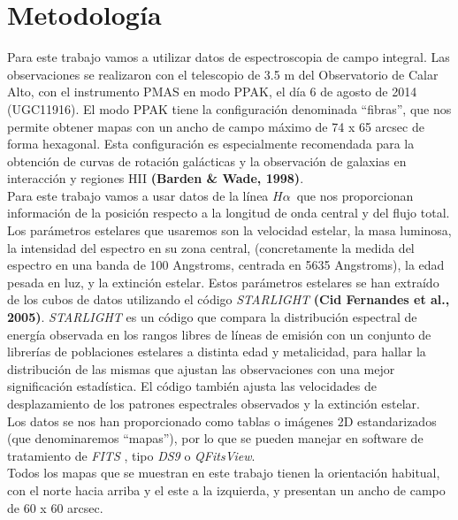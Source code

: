 \documentclass{article}
\newcommand{\hal}{$H\alpha$}
\begin{document}
\section{Metodología}
Para este trabajo vamos a utilizar datos de espectroscopia de campo integral. Las observaciones se realizaron con el telescopio de 3.5 m del Observatorio de Calar Alto, con el instrumento PMAS  en modo PPAK, el día 6 de agosto de 2014 (UGC11916). El modo PPAK tiene la configuración denominada ``fibras'', que nos permite obtener mapas con un ancho de campo máximo de 74 x 65 arcsec de forma hexagonal. Esta configuración es especialmente recomendada para la obtención de curvas de rotación galácticas y la observación de galaxias en interacción y regiones HII \textbf{(Barden \& Wade, 1998)}.\\Para este trabajo vamos a usar datos de la línea \hal\ que nos proporcionan información de la posición respecto a la longitud de onda central y del flujo total. Los parámetros estelares que usaremos son la velocidad estelar, la masa luminosa, la intensidad del espectro en su zona central, (concretamente la medida del espectro en una banda de 100 Angstroms, centrada en 5635 Angstroms), la edad pesada en luz, y la extinción estelar. Estos parámetros estelares se han extraído de los cubos de datos utilizando el código \emph{STARLIGHT} \textbf{(Cid Fernandes et al., 2005)}. \emph{STARLIGHT} es un código que compara la distribución espectral de energía observada en los rangos libres de líneas de emisión con un conjunto de librerías de poblaciones estelares a distinta edad y metalicidad, para hallar la distribución de las mismas que ajustan las observaciones con una mejor significación estadística. El código también ajusta las velocidades de desplazamiento de los patrones espectrales observados y la extinción estelar.\\Los datos se nos han proporcionado como tablas o imágenes 2D estandarizados (que denominaremos ``mapas''), por lo que se pueden manejar en software de tratamiento de \emph{FITS} , tipo \emph{DS9} o \emph{QFitsView}.\\Todos los mapas que se muestran en este trabajo tienen la orientación habitual, con el norte hacia arriba y el este a la izquierda, y presentan un ancho de campo de 60 x 60 arcsec.
\end{document}
